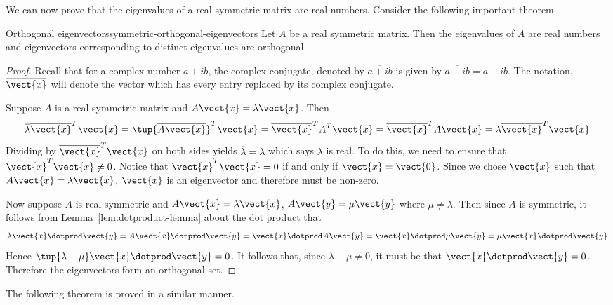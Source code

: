 We can now prove that the eigenvalues of a real symmetric matrix are real numbers.  Consider the following important theorem. 

\begin{theorem}{Orthogonal eigenvectors}{symmetric-orthogonal-eigenvectors}
Let $A$ be a real symmetric matrix. Then the eigenvalues of $A$ are real numbers and eigenvectors corresponding to distinct eigenvalues are orthogonal. 
\end{theorem}

\begin{proof}
Recall that for a complex number $a+ib$, the complex conjugate, denoted by $
\overline{a+ib}$ is given by $\overline{a+ib}=a-ib$. The
notation, $\overline{\vect{x}}$ will denote the vector which has every
entry replaced by its complex conjugate.

Suppose $A$ is a real symmetric matrix and $A\vect{x}=\lambda \vect{x}$.
Then 
\begin{equation*}
\overline{\lambda }\overline{\vect{x}}^{T}\vect{x}=\tup{\overline{A
\vect{x}}} ^{T}\vect{x}=\overline{\vect{x}}^{T}A^{T}\vect{x}=
\overline{\vect{x}}^{T}A\vect{x}=\lambda \overline{\vect{x}}^{T}
\vect{x}
\end{equation*}
Dividing by $\overline{\vect{x}}^{T}\vect{x}$ on both sides yields $
\overline{\lambda }=\lambda $ which says $\lambda $ is real. To do this, we need to ensure that $\overline{\vect{x}}^{T}\vect{x} \neq 0$. Notice that $\overline{\vect{x}}^{T}\vect{x} = 0$ if and only if $\vect{x} = \vect{0}$. Since we chose $\vect{x}$ such that $A\vect{x} = \lambda \vect{x}$, $\vect{x}$ is an eigenvector and therefore must be non-zero.  

Now suppose $A$ is real symmetric and $A\vect{x}=\lambda \vect{x}$, $A
\vect{y}=\mu \vect{y}$ where $\mu \neq \lambda$. Then since $A$
is symmetric, it follows from Lemma~\ref{lem:dotproduct-lemma} about the dot product that 
\begin{equation*}
\lambda \vect{x}\dotprod \vect{y}=A\vect{x}\dotprod \vect{y}=\vect{x}\dotprod A\vect{y}=\vect{x}\dotprod \mu \vect{y}=\mu \vect{x}\dotprod \vect{y}
\end{equation*}
Hence $\tup{\lambda -\mu } \vect{x}\dotprod \vect{y}=0$. It follows that,
since $\lambda -\mu \neq 0$, it must be that $\vect{x}\dotprod \vect{y}=0$. Therefore the eigenvectors form an orthogonal set. 
\end{proof}

The following theorem is proved in a similar manner.


